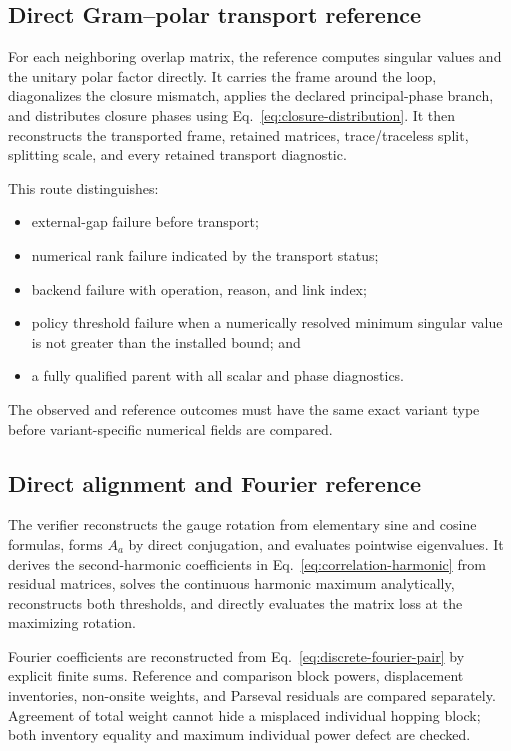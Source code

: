 \subsection{Direct Gram--polar transport reference}

For each neighboring overlap matrix, the reference computes singular values and the
unitary polar factor directly.  It carries the frame around the loop, diagonalizes the
closure mismatch, applies the declared principal-phase branch, and distributes closure
phases using Eq.~\eqref{eq:closure-distribution}.  It then reconstructs the transported
frame, retained matrices, trace/traceless split, splitting scale, and every retained
transport diagnostic.

This route distinguishes:
\begin{itemize}
 \item external-gap failure before transport;
 \item numerical rank failure indicated by the transport status;
 \item backend failure with operation, reason, and link index;
 \item policy threshold failure when a numerically resolved minimum singular value is
       not greater than the installed bound; and
 \item a fully qualified parent with all scalar and phase diagnostics.
\end{itemize}
The observed and reference outcomes must have the same exact variant type before
variant-specific numerical fields are compared.

\subsection{Direct alignment and Fourier reference}

The verifier reconstructs the gauge rotation from elementary sine and cosine formulas,
forms $A_a$ by direct conjugation, and evaluates pointwise eigenvalues.  It derives the
second-harmonic coefficients in Eq.~\eqref{eq:correlation-harmonic} from residual
matrices, solves the continuous harmonic maximum analytically, reconstructs both
thresholds, and directly evaluates the matrix loss at the maximizing rotation.

Fourier coefficients are reconstructed from Eq.~\eqref{eq:discrete-fourier-pair} by
explicit finite sums.  Reference and comparison block powers, displacement inventories,
non-onsite weights, and Parseval residuals are compared separately.  Agreement of total
weight cannot hide a misplaced individual hopping block; both inventory equality and
maximum individual power defect are checked.

